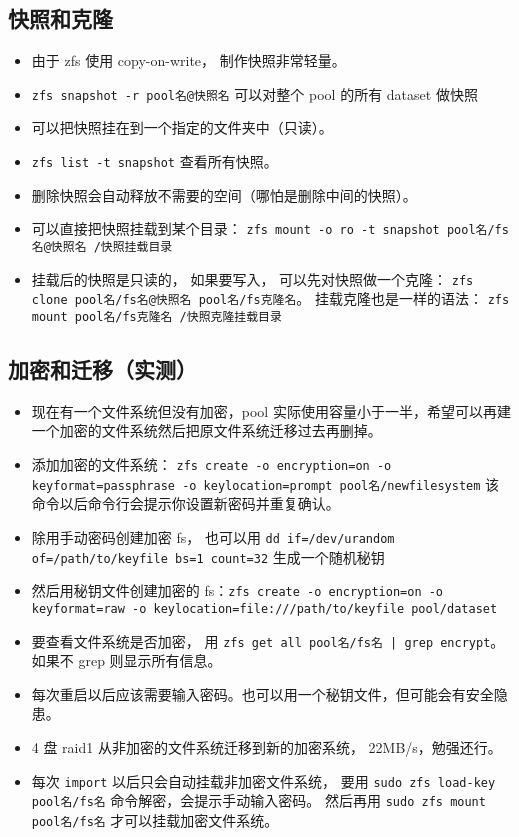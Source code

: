 \subsection{快照和克隆}
\begin{itemize}
\item 由于 zfs 使用 copy-on-write， 制作快照非常轻量。
\item \verb`zfs snapshot -r pool名@快照名` 可以对整个 pool 的所有 dataset 做快照
\item 可以把快照挂在到一个指定的文件夹中（只读）。
\item \verb|zfs list -t snapshot| 查看所有快照。
\item 删除快照会自动释放不需要的空间（哪怕是删除中间的快照）。
\item 可以直接把快照挂载到某个目录： \verb|zfs mount -o ro -t snapshot pool名/fs名@快照名 /快照挂载目录|
\item 挂载后的快照是只读的， 如果要写入， 可以先对快照做一个克隆： \verb|zfs clone pool名/fs名@快照名 pool名/fs克隆名|。 挂载克隆也是一样的语法： \verb|zfs mount pool名/fs克隆名 /快照克隆挂载目录|
\end{itemize}

\subsection{加密和迁移（实测）}
\begin{itemize}
\item 现在有一个文件系统但没有加密，pool 实际使用容量小于一半，希望可以再建一个加密的文件系统然后把原文件系统迁移过去再删掉。
\item 添加加密的文件系统： \verb`zfs create -o encryption=on -o keyformat=passphrase -o keylocation=prompt pool名/newfilesystem` 该命令以后命令行会提示你设置新密码并重复确认。
\item 除用手动密码创建加密 fs， 也可以用 \verb`dd if=/dev/urandom of=/path/to/keyfile bs=1 count=32` 生成一个随机秘钥
\item 然后用秘钥文件创建加密的 fs：\verb`zfs create -o encryption=on -o keyformat=raw -o keylocation=file:///path/to/keyfile pool/dataset`
\item 要查看文件系统是否加密， 用 \verb`zfs get all pool名/fs名 | grep encrypt`。 如果不 grep 则显示所有信息。
\item 每次重启以后应该需要输入密码。也可以用一个秘钥文件，但可能会有安全隐患。
\item 4 盘 raid1 从非加密的文件系统迁移到新的加密系统， 22MB/s，勉强还行。
\item 每次 \verb`import` 以后只会自动挂载非加密文件系统， 要用 \verb`sudo zfs load-key pool名/fs名` 命令解密，会提示手动输入密码。 然后再用 \verb`sudo zfs mount pool名/fs名` 才可以挂载加密文件系统。
\end{itemize}

